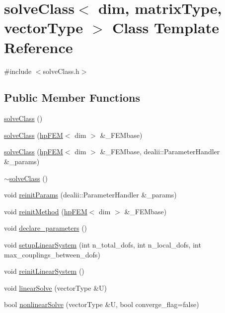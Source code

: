 \section{solve\-Class$<$ dim, matrix\-Type, vector\-Type $>$ Class Template Reference}
\label{classsolve_class}


{\ttfamily \#include $<$solve\-Class.\-h$>$}

\subsection*{Public Member Functions}
\begin{DoxyCompactItemize}
\item 
\hyperlink{classsolve_class_ac210b30d39cb640ec4d65b667467583d}{solve\-Class} ()
\item 
\hyperlink{classsolve_class_ada67813836ea60d10b21940008f37585}{solve\-Class} (\hyperlink{classhp_f_e_m}{hp\-F\-E\-M}$<$ dim $>$ \&\-\_\-\-F\-E\-Mbase)
\item 
\hyperlink{classsolve_class_a50fb5916f24e3b239ff60602c31cc536}{solve\-Class} (\hyperlink{classhp_f_e_m}{hp\-F\-E\-M}$<$ dim $>$ \&\-\_\-\-F\-E\-Mbase, dealii\-::\-Parameter\-Handler \&\-\_\-params)
\item 
\hyperlink{classsolve_class_a827189cdd4bd715d08e4cda1695c8409}{$\sim$solve\-Class} ()
\item 
void \hyperlink{classsolve_class_aa4ad1317ebf556afc0f3ffeed490dbb4}{reinit\-Params} (dealii\-::\-Parameter\-Handler \&\-\_\-params)
\item 
void \hyperlink{classsolve_class_a586d70f40869aa09462cc19291702910}{reinit\-Method} (\hyperlink{classhp_f_e_m}{hp\-F\-E\-M}$<$ dim $>$ \&\-\_\-\-F\-E\-Mbase)
\item 
void \hyperlink{classsolve_class_aec50a8e099e0110e5f8186a9ad9d0120}{declare\-\_\-parameters} ()
\item 
void \hyperlink{classsolve_class_abcdd7b865378898804f4831f0a078e04}{setup\-Linear\-System} (int n\-\_\-total\-\_\-dofs, int n\-\_\-local\-\_\-dofs, int max\-\_\-couplings\-\_\-between\-\_\-dofs)
\item 
void \hyperlink{classsolve_class_ab8aad4ce80f4f6fe8532c53e4bba67ec}{reinit\-Linear\-System} ()
\item 
void \hyperlink{classsolve_class_a9e6755b7d81862d2a8412de1eec855a7}{linear\-Solve} (vector\-Type \&U)
\item 
bool \hyperlink{classsolve_class_a9522b1c3074e38e3eeaa060a01709580}{nonlinear\-Solve} (vector\-Type \&U, bool converge\-\_\-flag=false)

\end{DoxyCompactItemize}
